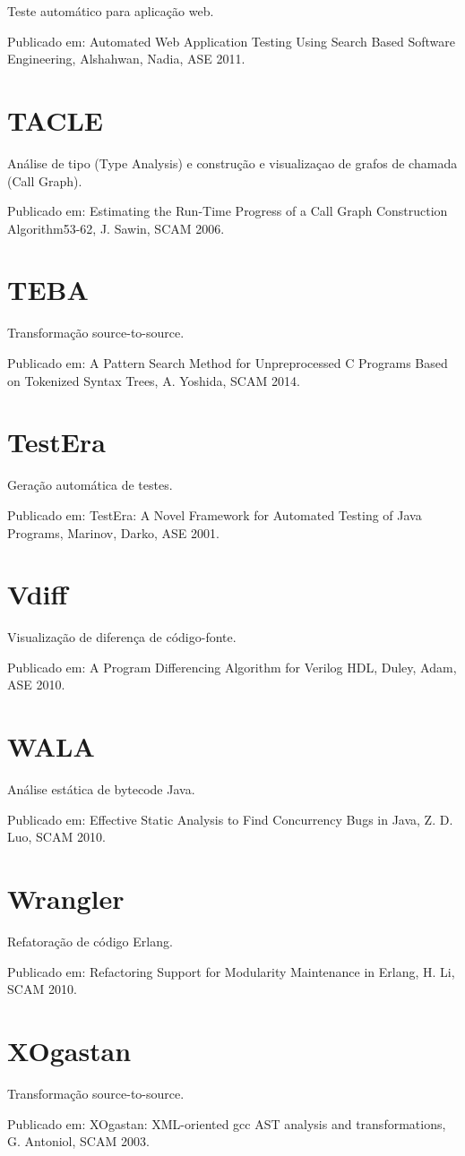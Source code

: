 Teste automático para aplicação web.

Publicado em: Automated Web Application Testing Using Search Based Software Engineering,
Alshahwan, Nadia,
ASE
2011.

\section{TACLE}

Análise de tipo (Type Analysis) e construção e visualizaçao de grafos de chamada (Call Graph).

Publicado em: Estimating the Run-Time Progress of a Call Graph Construction Algorithm53-62,
J. Sawin,
SCAM
2006.

\section{TEBA}

Transformação source-to-source.

Publicado em: A Pattern Search Method for Unpreprocessed C Programs Based on Tokenized Syntax Trees,
A. Yoshida,
SCAM
2014.

\section{TestEra}

Geração automática de testes.

Publicado em: TestEra: A Novel Framework for Automated Testing of Java Programs,
Marinov, Darko,
ASE
2001.

\section{Vdiff}

Visualização de diferença de código-fonte.

Publicado em: A Program Differencing Algorithm for Verilog HDL,
Duley, Adam,
ASE
2010.

\section{WALA}

Análise estática de bytecode Java.

Publicado em: Effective Static Analysis to Find Concurrency Bugs in Java,
Z. D. Luo,
SCAM
2010.

\section{Wrangler}

Refatoração de código Erlang.

Publicado em: Refactoring Support for Modularity Maintenance in Erlang,
H. Li,
SCAM
2010.

\section{XOgastan}

Transformação source-to-source.

Publicado em: XOgastan: XML-oriented gcc AST analysis and transformations,
G. Antoniol,
SCAM
2003.


